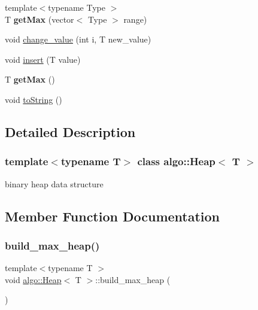 \begin{DoxyCompactItemize}
\item 
\mbox{\label{classalgo_1_1_heap_a19991daded2cd0f379de96d3c802384e}} 
{\footnotesize template$<$typename Type $>$ }\\T {\bfseries get\+Max} (vector$<$ Type $>$ range)
\item 
void \hyperlink{classalgo_1_1_heap_ab3ff726bf97a950f057d0756c4c5d00e}{change\+\_\+value} (int i, T new\+\_\+value)
\item 
void \hyperlink{classalgo_1_1_heap_abb3877c604a9e3f897f62f00c9cff922}{insert} (T value)
\item 
\mbox{\label{classalgo_1_1_heap_a2c6be6b44fff5e9ecde9827381176401}} 
T {\bfseries get\+Max} ()
\item 
void \hyperlink{classalgo_1_1_heap_a4ad945dce3d137b3212cdbde13694832}{to\+String} ()
\end{DoxyCompactItemize}


\subsection{Detailed Description}
\subsubsection*{template$<$typename T$>$\newline
class algo\+::\+Heap$<$ T $>$}

binary heap data structure 

\subsection{Member Function Documentation}
\mbox{\label{classalgo_1_1_heap_a983e27671ef1f049dca2b23de309f519}} 
\subsubsection{\texorpdfstring{build\+\_\+max\+\_\+heap()}{build\_max\_heap()}\hspace{0.1cm}{\footnotesize\ttfamily [1/2]}}
{\footnotesize\ttfamily template$<$typename T $>$ \\
void \hyperlink{classalgo_1_1_heap}{algo\+::\+Heap}$<$ T $>$\+::build\+\_\+max\+\_\+heap (\begin{DoxyParamCaption}{ }\end{DoxyParamCaption})\hspace{0.3cm}{\ttfamily [inline]}}

